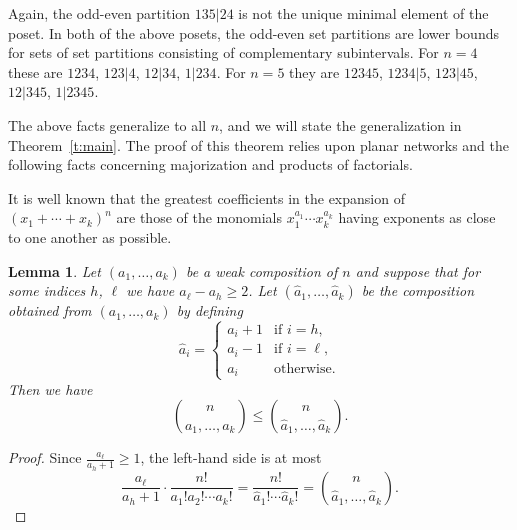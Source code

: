 \documentclass[12pt]{amsart}
\newtheorem{lem}[thm]{Lemma}
\theoremstyle{definition}
\numberwithin{equation}{section}
\begin{document}
Again, the odd-even partition $135|24$ is not the unique minimal element of the poset.
In both of the above posets, the odd-even set partitions are lower bounds for
sets of set partitions consisting of complementary subintervals.
For $n=4$ these are $1234$, $123|4$, $12|34$, $1|234$.
For $n=5$ they are $12345$, $1234|5$, $123|45$, $12|345$, $1|2345$.

The above facts generalize to all $n$, and we will state the generalization in
Theorem~\ref{t:main}.
The proof of this theorem relies upon
planar networks and the following
facts concerning majorization and products of factorials.

It is well known that the greatest coefficients in the expansion of
$(x_1 + \cdots + x_k)^n$ are those of the monomials
$x_1^{a_1} \cdots x_k^{a_k}$ having
exponents as close to one another as possible.
\begin{lem}\label{l:multiincrement}
    Let $(a_1,\dotsc, a_k)$ be a weak composition of $n$ and suppose that for some indices $h$, $\ell$ we have $a_\ell - a_h \geq 2$.
    Let $(\hat a_1, \dotsc, \hat a_k)$ be the composition obtained from
    $(a_1,\dotsc,a_k)$ by defining
    \begin{equation*}
        \hat a_i = \begin{cases}
            a_i + 1 &\text{if $i = h$},\\
            a_i -1 &\text{if $i = \ell$},\\
            a_i &\text{otherwise}.
        \end{cases}
    \end{equation*}
    Then we have
    \begin{equation*}
        {n \choose a_1,\dotsc,a_k} \leq {n \choose \hat a_1,\dotsc, \hat a_k }.
    \end{equation*}
\end{lem}
\begin{proof}
    Since $\tfrac{a_\ell}{a_h+1} \geq 1$,
    the left-hand side is at most
    \begin{equation*}
        \frac{a_\ell}{a_h+1} \cdot \frac{n!}{a_1!a_2!\cdots a_k!} = \frac{n!}{\hat a_1!\cdots \hat a_k!} = {n \choose \hat a_1, \dotsc, \hat a_k}.
    \end{equation*}
\end{proof}
\end{document}
